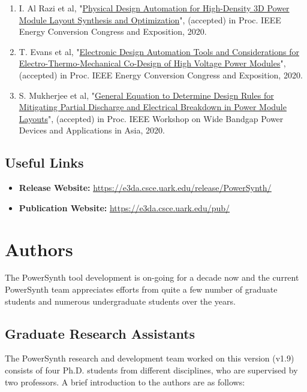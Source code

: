 \documentclass[11pt]{article}
\begin{document}
\begin{enumerate}
\item 	I. Al Razi et al, "\href{./Publications/I.Al.Razi-ECCE_20.pdf}{Physical Design Automation for High-Density 3D Power Module Layout Synthesis and Optimization}", (accepted) in Proc. IEEE Energy Conversion Congress and Exposition, 2020.

\item T. Evans et al, "\href{./Publications/T.Evans-ECCE_20.pdf}{Electronic Design Automation Tools and Considerations for Electro-Thermo-Mechanical Co-Design of High Voltage Power Modules}", (accepted) in Proc. IEEE Energy Conversion Congress and Exposition, 2020.

\item 	S. Mukherjee et al, "\href{./Publications/S.Mukherjee_WiPDA-Asia_20.pdf}{General Equation to Determine Design Rules for Mitigating Partial Discharge and Electrical Breakdown in Power Module Layouts}", (accepted) in Proc. IEEE Workshop on Wide Bandgap Power Devices and Applications in Asia, 2020.
\end{enumerate}

\subsection{Useful Links}

\begin{itemize}
    \item \textbf{Release Website:} \href{https://e3da.csce.uark.edu/release/PowerSynth/}{\underline{https://e3da.csce.uark.edu/release/PowerSynth/}}
    \item \textbf{Publication Website:} \href{https://e3da.csce.uark.edu/pub/}{\underline{https://e3da.csce.uark.edu/pub/}}
\end{itemize}



\pagebreak

\section{Authors}
The PowerSynth tool development is on-going for a decade now and the current PowerSynth team appreciates efforts from quite a few number of graduate students and numerous undergraduate students over the years.
\subsection{Graduate Research Assistants}
The PowerSynth research and development team worked on this version (v1.9) consists of four Ph.D. students from different disciplines, who are supervised by two professors. A brief introduction to the authors are as follows:
\end{document}
